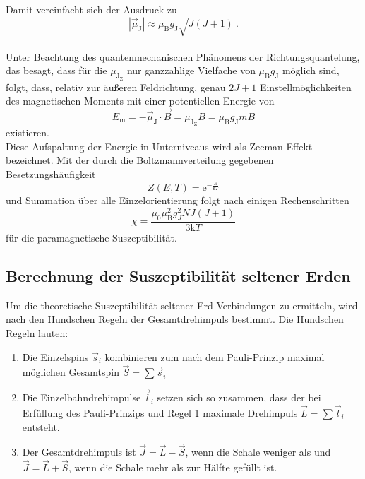 Damit vereinfacht sich der Ausdruck zu 
\begin{equation*}
    |\vec{\mu}_\text{J}| \approx \mu_\text{B} g_\text{J} \sqrt{J(J + 1)} \,.
\end{equation*} \\

Unter Beachtung des quantenmechanischen Phänomens der Richtungsquantelung, das besagt, dass für die $\mu_{\text{J}_\text{Z}}$ nur ganzzahlige Vielfache von $\mu_\text{B}g_\text{J}$ möglich sind, folgt,
dass, relativ zur äußeren Feldrichtung, genau $2J + 1$ Einstellmöglichkeiten des magnetischen Moments mit einer potentiellen Energie von
\begin{equation*}
    E_\text{m} = - \vec{\mu}_\text{J} \cdot \vec{B} = \mu_{\text{J}_\text{Z}} B = \mu_\text{B} g_\text{J} m B
\end{equation*}
existieren. \\

Diese Aufspaltung der Energie in Unterniveaus wird als Zeeman-Effekt bezeichnet.
Mit der durch die Boltzmannverteilung gegebenen Besetzungshäufigkeit
\begin{equation*}
    Z(E,T) = \text{e}^{-\frac{E}{\text{k}T}}
\end{equation*}
und Summation über alle Einzelorientierung folgt nach einigen Rechenschritten
\begin{equation*}
    \chi = \dfrac{\mu_0 \mu^2_\text{B} g^2_J N J(J + 1)}{3 \text{k} T}
    \label{eq:susg_J}
\end{equation*}
für die paramagnetische Suszeptibilität. \\

\subsection{Berechnung der Suszeptibilität seltener Erden}

Um die theoretische Suszeptibilität seltener Erd-Verbindungen zu ermitteln, wird nach den Hundschen Regeln der Gesamtdrehimpuls bestimmt.
Die Hundschen Regeln lauten:

\begin{enumerate}
    \item Die Einzelspins $\vec{s}_i$ kombinieren zum nach dem Pauli-Prinzip maximal möglichen Gesamtspin $\vec{S} = \sum\vec{s}_i$
    \item Die Einzelbahndrehimpulse $\vec{l}_i$ setzen sich so zusammen, dass der bei Erfüllung des Pauli-Prinzips und Regel 1 maximale Drehimpuls $\vec{L} = \sum \vec{l}_i$ entsteht.
    \item Der Gesamtdrehimpuls ist $\vec{J} = \vec{L} - \vec{S}$, wenn die Schale weniger als und $\vec{J} = \vec{L} + \vec{S}$, wenn die Schale mehr als zur Hälfte gefüllt ist.
\end{enumerate}

